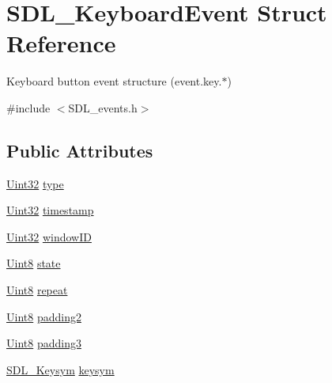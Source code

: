 \hypertarget{struct_s_d_l___keyboard_event}{}\section{S\+D\+L\+\_\+\+Keyboard\+Event Struct Reference}
\label{struct_s_d_l___keyboard_event}


Keyboard button event structure (event.\+key.$\ast$)  




{\ttfamily \#include $<$S\+D\+L\+\_\+events.\+h$>$}

\subsection*{Public Attributes}
\begin{DoxyCompactItemize}
\item 
\mbox{\hyperlink{_s_d_l__stdinc_8h_add440eff171ea5f55cb00c4a9ab8672d}{Uint32}} \mbox{\hyperlink{struct_s_d_l___keyboard_event_ae0b2f2aace6f80c1f47e5a14350d409a}{type}}
\item 
\mbox{\hyperlink{_s_d_l__stdinc_8h_add440eff171ea5f55cb00c4a9ab8672d}{Uint32}} \mbox{\hyperlink{struct_s_d_l___keyboard_event_a3da1d8f6892e7f6ee28d9eafdb5e7d02}{timestamp}}
\item 
\mbox{\hyperlink{_s_d_l__stdinc_8h_add440eff171ea5f55cb00c4a9ab8672d}{Uint32}} \mbox{\hyperlink{struct_s_d_l___keyboard_event_a56efb6780b96acd5b50d8f797efb3546}{window\+ID}}
\item 
\mbox{\hyperlink{_s_d_l__stdinc_8h_a2944638813a090aa23e62f4da842c3e2}{Uint8}} \mbox{\hyperlink{struct_s_d_l___keyboard_event_a110558eb96c113c86cfa31a7018c2346}{state}}
\item 
\mbox{\hyperlink{_s_d_l__stdinc_8h_a2944638813a090aa23e62f4da842c3e2}{Uint8}} \mbox{\hyperlink{struct_s_d_l___keyboard_event_a3edac3b36304812d533795c9df4ed4c1}{repeat}}
\item 
\mbox{\hyperlink{_s_d_l__stdinc_8h_a2944638813a090aa23e62f4da842c3e2}{Uint8}} \mbox{\hyperlink{struct_s_d_l___keyboard_event_ae270122f757f76171318294afd2c95e6}{padding2}}
\item 
\mbox{\hyperlink{_s_d_l__stdinc_8h_a2944638813a090aa23e62f4da842c3e2}{Uint8}} \mbox{\hyperlink{struct_s_d_l___keyboard_event_ae1831035ef556a7b09efcd2469f26f7a}{padding3}}
\item 
\mbox{\hyperlink{struct_s_d_l___keysym}{S\+D\+L\+\_\+\+Keysym}} \mbox{\hyperlink{struct_s_d_l___keyboard_event_a2a57ba820a298f2c02ad5d41fd2b1aa8}{keysym}}
\end{DoxyCompactItemize}


